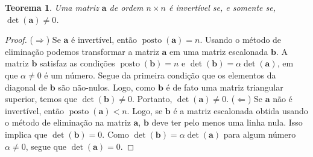 \documentclass[12pt,a4paper]{report}
\newcommand{\mb}{\mathbf}
\newtheorem{thm}{Teorema}[chapter]
\DeclareMathOperator{\posto}{posto}
\begin{document}
\begin{thm}
  Uma matriz $\mb a$ de ordem $n\times n$ é invertível se, e somente se, $\det(\mb a)\ne 0$.
\end{thm}
\begin{proof}
  ($\Rightarrow$) Se $\mb a$ é invertível, então $\posto(\mb a)=n$. Usando o método de eliminação podemos transformar a matriz $\mb a$ em uma matriz escalonada $\mb b$.
  A matriz $\mb b$ satisfaz as condições $\posto(\mb b)=n$ e $\det(\mb b)=\alpha\det(\mb a)$, em que $\alpha\ne 0$ é um número. Segue da primeira condição que os elementos da diagonal de $\mb b$ são não-nulos. Logo, como $\mb b$ é de fato uma matriz triangular superior, temos que $\det(\mb b)\ne 0$. Portanto, $\det(\mb a)\ne 0$.
  ($\Leftarrow$) Se $\mb a$ não é invertível, então $\posto(\mb a)<n$. Logo, se $\mb b$ é a matriz escalonada obtida usando o método de eliminação na matriz $\mb a$, $\mb b$ deve ter pelo menos uma linha nula. Isso implica que $\det(\mb b)=0$. Como $\det(\mb b)=\alpha\det(\mb a)$ para algum número $\alpha\ne 0$, segue que $\det(\mb a)=0$.
\end{proof}
\end{document}
